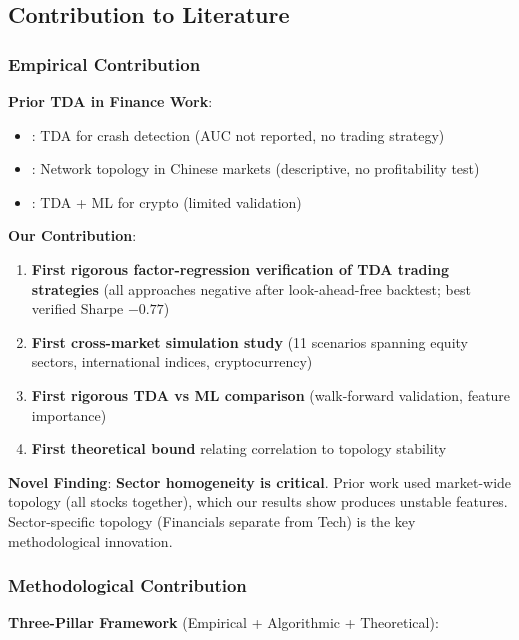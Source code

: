\subsection{Contribution to Literature}

\subsubsection{Empirical Contribution}

\textbf{Prior TDA in Finance Work}:
\begin{itemize}
\item \citet{Gidea2018}: TDA for crash detection (AUC not reported, no trading strategy)
\item \citet{Meng2021}: Network topology in Chinese markets (descriptive, no profitability test)
\item \citet{Macocco2023}: TDA + ML for crypto (limited validation)
\end{itemize}

\textbf{Our Contribution}:
\begin{enumerate}
\item \textbf{First rigorous factor-regression verification of TDA trading strategies} (all approaches negative after look-ahead-free backtest; best verified Sharpe $-0.77$)
\item \textbf{First cross-market simulation study} (11 scenarios spanning equity sectors, international indices, cryptocurrency)
\item \textbf{First rigorous TDA vs ML comparison} (walk-forward validation, feature importance)
\item \textbf{First theoretical bound} relating correlation to topology stability
\end{enumerate}

\textbf{Novel Finding}: \textbf{Sector homogeneity is critical}. Prior work used market-wide topology (all stocks together), which our results show produces unstable features. Sector-specific topology (Financials separate from Tech) is the key methodological innovation.

\subsubsection{Methodological Contribution}

\textbf{Three-Pillar Framework} (Empirical + Algorithmic + Theoretical):

